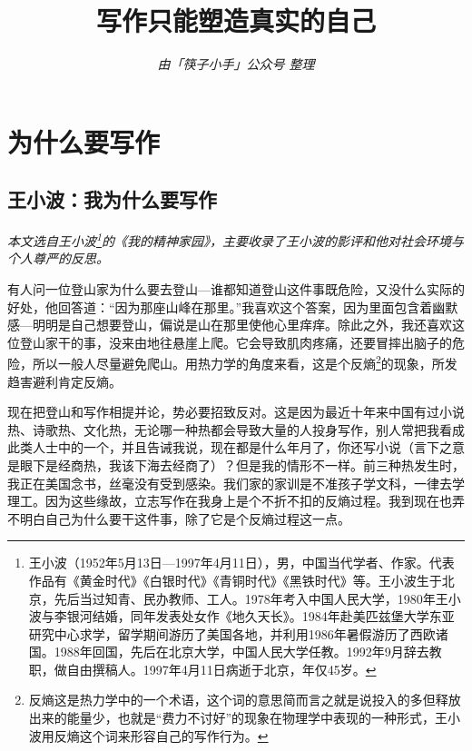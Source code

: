 \documentclass[12pt,a5paper]{ctexbook}
\title{\Huge{\textbf{写作只能塑造真实的自己}}}
\author{\small{\emph{由「筷子小手」公众号 \space{} 整理}}}
\date{}
\begin{document}
\maketitle %

\thispagestyle{empty} %
\newpage

\thispagestyle{empty}
\tableofcontents %
\newpage


\pagestyle{plain}
\setcounter{page}{1} %

\chapter{为什么要写作}

\section{王小波：我为什么要写作}


\emph{本文选自王小波\footnote{王小波（1952年5月13日—1997年4月11日），男，中国当代学者、作家。代表作品有《黄金时代》《白银时代》《青铜时代》《黑铁时代》等。王小波生于北京，先后当过知青、民办教师、工人。1978年考入中国人民大学，1980年王小波与李银河结婚，同年发表处女作《地久天长》。1984年赴美匹兹堡大学东亚研究中心求学，留学期间游历了美国各地，并利用1986年暑假游历了西欧诸国。1988年回国，先后在北京大学，中国人民大学任教。1992年9月辞去教职，做自由撰稿人。1997年4月11日病逝于北京，年仅45岁。}的《我的精神家园》，主要收录了王小波的影评和他对社会环境与个人尊严的反思。}

\vspace{2em}

有人问一位登山家为什么要去登山—谁都知道登山这件事既危险，又没什么实际的好处，他回答道：“因为那座山峰在那里。”我喜欢这个答案，因为里面包含着幽默感—明明是自己想要登山，偏说是山在那里使他心里痒痒。除此之外，我还喜欢这位登山家干的事，没来由地往悬崖上爬。它会导致肌肉疼痛，还要冒摔出脑子的危险，所以一般人尽量避免爬山。用热力学的角度来看，这是个反熵\footnote{反熵这是热力学中的一个术语，这个词的意思简而言之就是说投入的多但释放出来的能量少，也就是“费力不讨好”的现象在物理学中表现的一种形式，王小波用反熵这个词来形容自己的写作行为。}的现象，所发趋害避利肯定反熵。

现在把登山和写作相提并论，势必要招致反对。这是因为最近十年来中国有过小说热、诗歌热、文化热，无论哪一种热都会导致大量的人投身写作，别人常把我看成此类人士中的一个，并且告诫我说，现在都是什么年月了，你还写小说（言下之意是眼下是经商热，我该下海去经商了）？但是我的情形不一样。前三种热发生时，我正在美国念书，丝毫没有受到感染。我们家的家训是不准孩子学文科，一律去学理工。因为这些缘故，立志写作在我身上是个不折不扣的反熵过程。我到现在也弄不明白自己为什么要干这件事，除了它是个反熵过程这一点。
\end{document}
